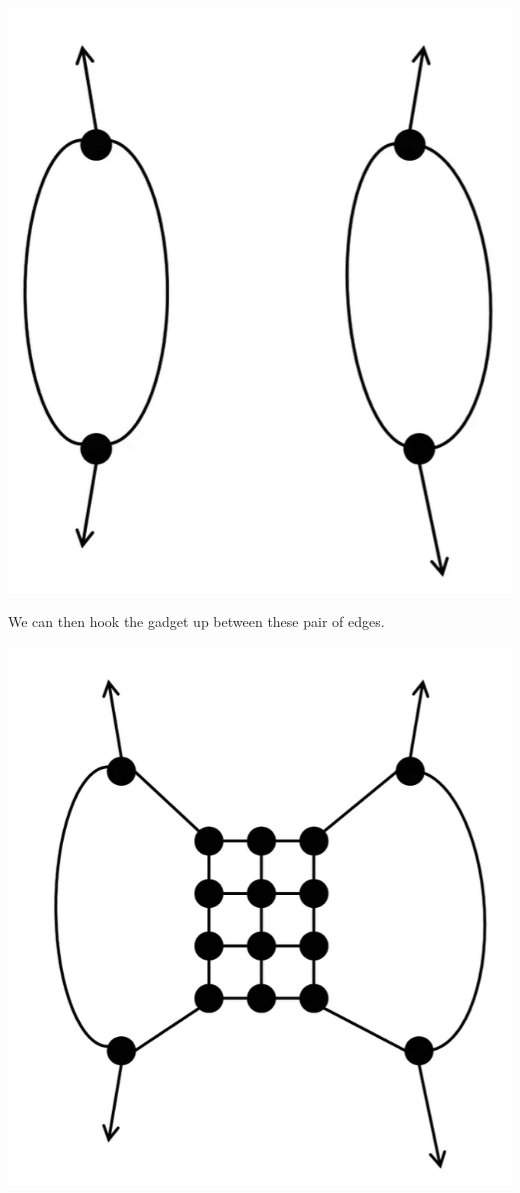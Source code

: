 \documentclass[letterpaper]{article}
\begin{document}
\begin{itemize}
\begin{center}
        \includegraphics[scale=0.35]{../assets/zoe_ham_7.png}
    \end{center}
    We can then hook the gadget up between these pair of edges. 
    \begin{center}
        \includegraphics[scale=0.35]{../assets/zoe_ham_8.png}

\end{center}
\end{itemize}
\end{document}
